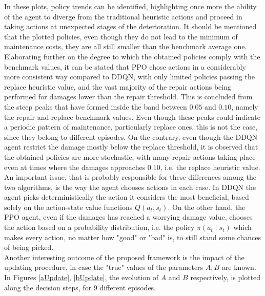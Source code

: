 In these plots, policy trends can be identified, highlighting once more the ability of the agent to diverge from the traditional heuristic actions and proceed in taking actions at unexpected stages of the deterioration. It should be mentioned that the plotted policies, even though they do not lead to the minimum of maintenance costs, they are all still smaller than the benchmark average one. Elaborating further on the degree to which the obtained policies comply with the benchmark values, it can be stated that \gls{PPO} chose actions in a considerably more consistent way compared to \gls{DDQN}, with only limited policies passing the replace heuristic value, and the vast majority of the repair actions being performed for damages lower than the repair threshold. This is concluded from the steep peaks that have formed inside the band between $0.05$ and $0.10$, namely the repair and replace benchmark values. Even though these peaks could indicate a periodic pattern of maintenance, particularly replace ones, this is not the case, since they belong to different episodes. On the contrary, even though the \gls{DDQN} agent restrict the damage mostly below the replace threshold, it is observed that the obtained policies are more stochastic, with many repair actions taking place even at times where the damages approaches $0.10$, i.e. the replace heuristic value. An important issue, that is probably responsible for these differences among the two algorithms, is the way the agent chooses actions in each case. In \gls{DDQN} the agent picks deterministically the action it considers the most beneficial, based solely on the action-state value functions $Q(a_t, s_t)$. On the other hand, the \gls{PPO} agent, even if the damages has reached a worrying damage value, chooses the action based on a probability distribution, i.e. the policy $\pi(a_t \mid s_t)$ which makes every action, no matter how "good" or "bad" is, to still stand some chances of being picked.\\

Another interesting outcome of the proposed framework is the impact of the updating procedure, in case the "true" values of the parameters $A, B$ are known. In Figures \ref{aUpdate}, \ref{bUpdate}, the evolution of $A$ and $B$ respectively, is plotted along the decision steps, for 9 different episodes.


